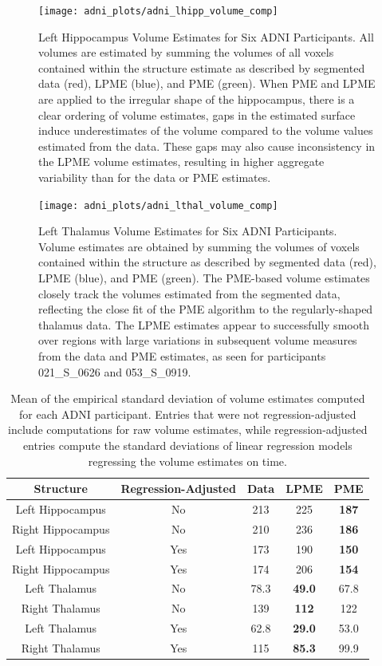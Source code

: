 \documentclass[11pt,reqno]{article}
\theoremstyle{definition}
\begin{document}
\begin{figure}[h]
  \centering
  \texttt{[image: adni\_plots/adni\_lhipp\_volume\_comp]}
  \caption{Left Hippocampus Volume Estimates for Six ADNI Participants. All volumes are estimated by summing the volumes of all voxels contained within the structure estimate as described by segmented data (red), LPME (blue), and PME (green). When PME and LPME are applied to the irregular shape of the hippocampus, there is a clear ordering of volume estimates, gaps in the estimated surface induce underestimates of the volume compared to the volume values estimated from the data. These gaps may also cause inconsistency in the LPME volume estimates, resulting in higher aggregate variability than for the data or PME estimates.}
  \label{fig:lhipp_volume_comparison}
\end{figure}

\begin{figure}[h]
  \centering
  \texttt{[image: adni\_plots/adni\_lthal\_volume\_comp]}
  \caption{Left Thalamus Volume Estimates for Six ADNI Participants. Volume estimates are obtained by summing the volumes of voxels contained within the structure as described by segmented data (red), LPME (blue), and PME (green). The PME-based volume estimates closely track the volumes estimated from the segmented data, reflecting the close fit of the PME algorithm to the regularly-shaped thalamus data. The LPME estimates appear to successfully smooth over regions with large variations in subsequent volume measures from the data and PME estimates, as seen for participants 021\_S\_0626 and 053\_S\_0919.}
  \label{fig:lthal_volume_comparison}
\end{figure}


\begin{table}[ht]
  \centering
  \begin{tabular}{|c c c c c|}
    \hline
    Structure & Regression-Adjusted & Data & LPME & PME  \\
    \hline
    Left Hippocampus & No & 213 & 225 & \textbf{187} \\
    Right Hippocampus & No & 210 & 236 & \textbf{186} \\
    Left Hippocampus & Yes & 173 & 190 & \textbf{150} \\
    Right Hippocampus & Yes & 174 & 206 & \textbf{154} \\
    Left Thalamus & No & 78.3 & \textbf{49.0} & 67.8 \\
    Right Thalamus & No & 139 & \textbf{112} & 122 \\
    Left Thalamus & Yes & 62.8 & \textbf{29.0} & 53.0 \\
    Right Thalamus & Yes & 115 & \textbf{85.3} & 99.9 \\
    \hline
  \end{tabular}
  \caption{Mean of the empirical standard deviation of volume estimates computed for each ADNI participant. Entries that were not regression-adjusted include computations for raw volume estimates, while regression-adjusted entries compute the standard deviations of linear regression models regressing the volume estimates on time. }
  \label{table:adni_volume_sds}
\end{table}
\end{document}
